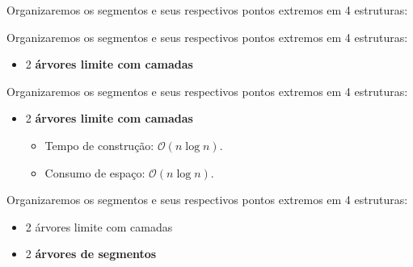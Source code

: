 \documentclass[
paper=128mm:96mm, %
fontsize=11pt, %
pagesize, %
parskip=half-, %
]{scrartcl} %
\newcommand*{\myblack}[1]{\textcolor{myblack}{#1}}
\theoremstyle{mythmstyle} %
\begin{document}
\clearpage

\begin{flushleft}
  Organizaremos os segmentos e seus respectivos pontos extremos em 4 estruturas:
\end{flushleft}
  
\clearpage


\begin{flushleft}
  Organizaremos os segmentos e seus respectivos pontos extremos em 4 estruturas:

  \begin{itemize}
  \item 2 \textbf{\myblack{árvores limite com camadas}}
  \end{itemize}
\end{flushleft}
  
\clearpage


\begin{flushleft}
  Organizaremos os segmentos e seus respectivos pontos extremos em 4 estruturas:

  \begin{itemize}
  \item 2 \textbf{\myblack{árvores limite com camadas}}
    \begin{itemize}
      \item Tempo de construção: $\mathcal{O}(n \log n)$.
      \item Consumo de espaço: $\mathcal{O}(n \log n)$.
    \end{itemize}
  \end{itemize}
\end{flushleft}

\clearpage




\begin{flushleft}
  Organizaremos os segmentos e seus respectivos pontos extremos em 4 estruturas:

  \begin{itemize}
  \item 2 árvores limite com camadas
  \item 2 \textbf{\myblack{árvores de segmentos}}
  \end{itemize}
\end{flushleft}
  
\end{document}
